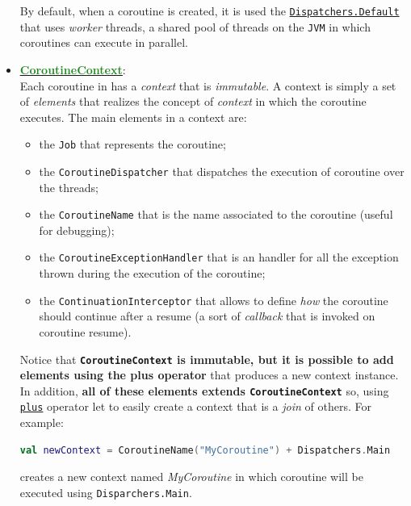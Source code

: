 \begin{itemize}
	By default, when a coroutine is created, it is used the \href{https://kotlinlang.org/api/kotlinx.coroutines/kotlinx-coroutines-core/kotlinx.coroutines/-dispatchers/-default.html}{\texttt{Dispatchers.Default}} that uses \textit{worker} threads, a shared pool of threads on the \texttt{JVM} in which coroutines can execute in parallel. 
	
	\item \href{https://kotlinlang.org/api/latest/jvm/stdlib/kotlin.coroutines/-coroutine-context/}{\underline{\textbf{\textcolor{ForestGreen}{CoroutineContext}}}}:\\
	Each coroutine in \Kotlin has a \textit{context} that is \textit{immutable}. A context is simply a set of \textit{elements} that realizes the concept of \textit{context} in which the coroutine executes.
	The main elements in a context are:
	\begin{itemize}
		\item the \texttt{Job} that represents the coroutine;
		\item the \texttt{CoroutineDispatcher} that dispatches the execution of coroutine over the threads;
		\item the \texttt{CoroutineName} that is the name associated to the coroutine (useful for debugging);
		\item the \texttt{CoroutineExceptionHandler} that is an handler for all the exception thrown during the execution of the coroutine;
		\item the \texttt{ContinuationInterceptor} that allows to define \textit{how} the coroutine should continue after a resume (a sort of \textit{callback} that is invoked on coroutine resume).
	\end{itemize}
	
	Notice that \textbf{\texttt{CoroutineContext} is immutable, but it is possible to add elements using the plus operator} that produces a new context instance. In addition, \textbf{all of these elements extends \texttt{CoroutineContext}} so, using \href{https://kotlinlang.org/api/latest/jvm/stdlib/kotlin.coroutines/-coroutine-context/plus.html}{\texttt{plus}} operator let to easily create a context that is a \textit{join} of others.
	For example:
	\begin{lstlisting}[language=Kotlin,numbers=none]
		val newContext = CoroutineName("MyCoroutine") + Dispatchers.Main
	\end{lstlisting}
	creates a new context named \textit{MyCoroutine} in which coroutine will be executed using \texttt{Disparchers.Main}.
	

\end{itemize}

